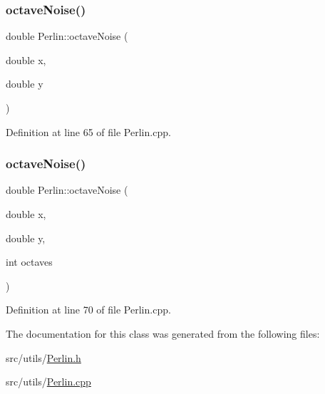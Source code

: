 \subsubsection{\texorpdfstring{octaveNoise()}{octaveNoise()}\hspace{0.1cm}{\footnotesize\ttfamily [1/2]}}
{\footnotesize\ttfamily double Perlin\+::octave\+Noise (\begin{DoxyParamCaption}\item[{double}]{x,  }\item[{double}]{y }\end{DoxyParamCaption})}



Definition at line 65 of file Perlin.\+cpp.

\mbox{\label{class_world_architect_1_1_perlin_ac3dd81a7e37765c1ec13930cce207d56}} 
\subsubsection{\texorpdfstring{octaveNoise()}{octaveNoise()}\hspace{0.1cm}{\footnotesize\ttfamily [2/2]}}
{\footnotesize\ttfamily double Perlin\+::octave\+Noise (\begin{DoxyParamCaption}\item[{double}]{x,  }\item[{double}]{y,  }\item[{int}]{octaves }\end{DoxyParamCaption})}



Definition at line 70 of file Perlin.\+cpp.



The documentation for this class was generated from the following files\+:\begin{DoxyCompactItemize}
\item 
src/utils/\mbox{\hyperlink{_perlin_8h}{Perlin.\+h}}\item 
src/utils/\mbox{\hyperlink{_perlin_8cpp}{Perlin.\+cpp}}\end{DoxyCompactItemize}
